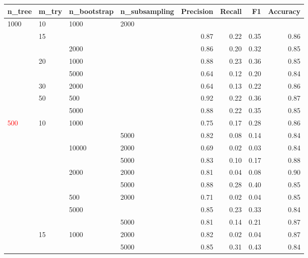 \documentclass[a4paper,10pt]{article}
\begin{document}
\begin{table}[!ht]
\centering
\begin{footnotesize}
\begin{tabular}{llllrrrr}
\toprule
 n\_tree    &  m\_try  & n\_bootstrap     &  n\_subsampling    &  Precision &     Recall &         F1 &   Accuracy \\
\midrule
1000 & 10 & 1000 & 2000 &            &            &            &            \\
     & 15 &      &      &       0.87 &       0.22 &       0.35 &       0.86 \\
     &    & 2000 &      &       0.86 &       0.20 &       0.32 &       0.85 \\
     & 20 & 1000 &      &       0.88 &       0.23 &       0.36 &       0.85 \\
     &    & 5000 &      &       0.64 &       0.12 &       0.20 &       0.84 \\
     & 30 & 2000 &      &       0.64 &       0.13 &       0.22 &       0.86 \\
     & 50 & 500 &      &       0.92 &       0.22 &       0.36 &       0.87 \\
     &    & 5000 &      &       0.88 &       0.22 &       0.35 &       0.85 \\
\textcolor{red}{500} & 10 & 1000 &      &       0.75 &       0.17 &       0.28 &       0.86 \\
     &    &      & 5000 &       0.82 &       0.08 &       0.14 &       0.84 \\
     &    & 10000 & 2000 &       0.69 &       0.02 &       0.03 &       0.84 \\
     &    &      & 5000 &       0.83 &       0.10 &       0.17 &       0.88 \\
     &    & 2000 & 2000 &       0.81 &       0.04 &       0.08 &       0.90 \\
     &    &      & 5000 &       0.88 &       0.28 &       0.40 &       0.85 \\
     &    & 500 & 2000 &       0.71 &       0.02 &       0.04 &       0.85 \\
     &    & 5000 &      &       0.85 &       0.23 &       0.33 &       0.84 \\
     &    &      & 5000 &       0.81 &       0.14 &       0.21 &       0.87 \\
     & 15 & 1000 & 2000 &       0.82 &       0.02 &       0.04 &       0.87 \\
     &    &      & 5000 &       0.85 &       0.31 &       0.43 &       0.84 \\

\end{tabular}
\end{footnotesize}
\end{table}
\end{document}
